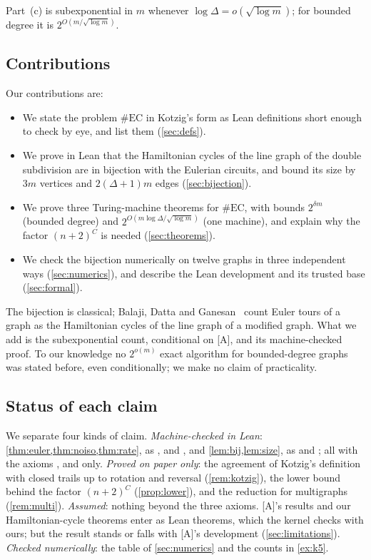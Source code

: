 \documentclass[10pt]{amsart}
\theoremstyle{plain}
\theoremstyle{definition}
\theoremstyle{remark}
\numberwithin{equation}{section}
\newcommand{\A}{\textup{[A]}}
\begin{document}
\noindent Part~(c) is subexponential in $m$ whenever $\log\Delta=o(\sqrt{\log m})$; for bounded
degree it is $2^{O(m/\sqrt{\log m})}$.

\subsection{Contributions}
Our contributions are:
\begin{itemize}
\item We state the problem $\#\mathrm{EC}$ in Kotzig's form as Lean definitions short enough to check
by eye, and list them (\cref{sec:defs}).
\item We prove in Lean that the Hamiltonian cycles of the line graph of the double subdivision are in
bijection with the Eulerian circuits, and bound its size by $3m$ vertices and $2(\Delta+1)m$ edges
(\cref{sec:bijection}).
\item We prove three Turing-machine theorems for $\#\mathrm{EC}$, with bounds $2^{\delta m}$ (bounded
degree) and $2^{O(m\log\Delta/\sqrt{\log m})}$ (one machine), and explain why the factor $(n+2)^C$ is
needed (\cref{sec:theorems}).
\item We check the bijection numerically on twelve graphs in three independent ways
(\cref{sec:numerics}), and describe the Lean development and its trusted base (\cref{sec:formal}).
\end{itemize}
The bijection is classical; Balaji, Datta and Ganesan~\cite{BDG15} count Euler tours of a graph as the
Hamiltonian cycles of the line graph of a modified graph. What we add is the
subexponential count, conditional on \A, and its machine-checked proof. To our knowledge no
$2^{o(m)}$ exact algorithm for bounded-degree graphs was stated before, even conditionally; we make
no claim of practicality.

\subsection{Status of each claim}
We separate four kinds of claim.
\emph{Machine-checked in Lean}: \cref{thm:euler,thm:noiso,thm:rate}, as
,  and
, and \cref{lem:bij,lem:size}, as
 and ; all with the
axioms ,  and  only.
\emph{Proved on paper only}: the agreement of Kotzig's definition with closed trails up to rotation
and reversal (\cref{rem:kotzig}), the lower bound behind the factor $(n+2)^C$ (\cref{prop:lower}), and
the reduction for multigraphs (\cref{rem:multi}).
\emph{Assumed}: nothing beyond the three axioms. \A's results and our Hamiltonian-cycle theorems
enter as Lean theorems, which the kernel checks with ours; but the result stands or falls with \A's
development (\cref{sec:limitations}).
\emph{Checked numerically}: the table of \cref{sec:numerics} and the counts in \cref{ex:k5}.
\end{document}
